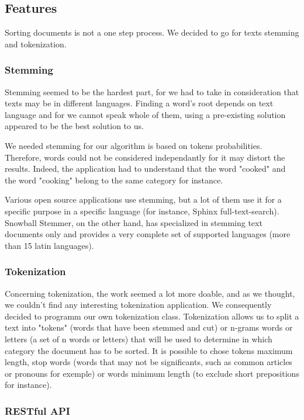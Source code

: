 \documentclass[a4paper,11pt]{article}
\begin{document}
\subsection{Features}

Sorting documents is not a one step process. We decided to go for texts
stemming and tokenization.

\subsubsection{Stemming}

Stemming seemed to be the hardest part, for we had to take in consideration
that texts may be in different languages. Finding a word's root depends on
text language and for we cannot speak whole of them, using a pre-existing
solution appeared to be the best solution to us.

We needed stemming for our algorithm is based on tokens probabilities.
Therefore, words could not be considered independantly for it may distort
the results. Indeed, the application had to understand that the word "cooked"
and the word "cooking" belong to the same category for instance.

Various open source applications use stemming, but a lot of them use it for
a specific purpose in a specific language (for instance, Sphinx
full-text-search). Snowball Stemmer, on the other hand, has specialized in
stemming text documents only and provides a very complete set of supported
languages (more than 15 latin languages).

\subsubsection{Tokenization}

Concerning tokenization, the work seemed a lot more doable, and as we
thought, we couldn't find any interesting tokenization application. We
consequently decided to programm our own tokenization class.
Tokenization allows us to split a text into "tokens" (words that have
been stemmed and cut) or n-grams words or letters (a set of n words or
letters) that will be used to determine in which category the document has to
 be sorted. It is possible to chose tokens maximum length, stop words (words
that may not be significants, such as common articles or pronouns for
exemple) or words minimum length (to exclude short prepositions for
instance).

\subsubsection{RESTful API}
\end{document}
